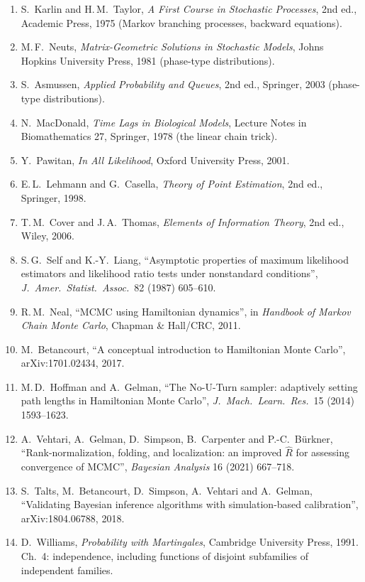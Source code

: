 \documentclass[11pt]{article}
\theoremstyle{definition}
\theoremstyle{remark}
\begin{document}
\begin{enumerate}
\item[{[15]}] S.\ Karlin and H.\,M.\ Taylor, \emph{A First Course in Stochastic Processes}, 2nd ed., Academic Press, 1975 (Markov branching processes, backward equations).
\item[{[16]}] M.\,F.\ Neuts, \emph{Matrix-Geometric Solutions in Stochastic Models}, Johns Hopkins University Press, 1981 (phase-type distributions).
\item[{[17]}] S.\ Asmussen, \emph{Applied Probability and Queues}, 2nd ed., Springer, 2003 (phase-type distributions).
\item[{[18]}] N.\ MacDonald, \emph{Time Lags in Biological Models}, Lecture Notes in Biomathematics 27, Springer, 1978 (the linear chain trick).
\item[{[19]}] Y.\ Pawitan, \emph{In All Likelihood}, Oxford University Press, 2001.
\item[{[20]}] E.\,L.\ Lehmann and G.\ Casella, \emph{Theory of Point Estimation}, 2nd ed., Springer, 1998.
\item[{[21]}] T.\,M.\ Cover and J.\,A.\ Thomas, \emph{Elements of Information Theory}, 2nd ed., Wiley, 2006.
\item[{[22]}] S.\,G.\ Self and K.-Y.\ Liang, ``Asymptotic properties of maximum likelihood estimators and likelihood ratio tests under nonstandard conditions'', \emph{J.\ Amer.\ Statist.\ Assoc.}\ 82 (1987) 605--610.
\item[{[23]}] R.\,M.\ Neal, ``MCMC using Hamiltonian dynamics'', in \emph{Handbook of Markov Chain Monte Carlo}, Chapman \& Hall/CRC, 2011.
\item[{[24]}] M.\ Betancourt, ``A conceptual introduction to Hamiltonian Monte Carlo'', arXiv:1701.02434, 2017.
\item[{[25]}] M.\,D.\ Hoffman and A.\ Gelman, ``The No-U-Turn sampler: adaptively setting path lengths in Hamiltonian Monte Carlo'', \emph{J.\ Mach.\ Learn.\ Res.}\ 15 (2014) 1593--1623.
\item[{[26]}] A.\ Vehtari, A.\ Gelman, D.\ Simpson, B.\ Carpenter and P.-C.\ B\"urkner, ``Rank-normalization, folding, and localization: an improved $\hat R$ for assessing convergence of MCMC'', \emph{Bayesian Analysis} 16 (2021) 667--718.
\item[{[27]}] S.\ Talts, M.\ Betancourt, D.\ Simpson, A.\ Vehtari and A.\ Gelman, ``Validating Bayesian inference algorithms with simulation-based calibration'', arXiv:1804.06788, 2018.
\item[{[28]}] D.\ Williams, \emph{Probability with Martingales}, Cambridge University Press, 1991. Ch.~4: independence, including functions of disjoint subfamilies of independent families.
\end{enumerate}
\end{document}

